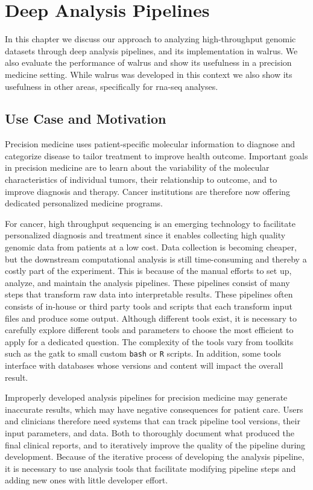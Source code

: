 \chapter{Deep Analysis Pipelines}\label{pipeline}  
In this chapter we discuss our approach to analyzing high-throughput genomic
datasets through deep analysis pipelines, and its implementation in 
walrus.\cite{walrus} We also evaluate the performance of walrus and show its
usefulness in a precision medicine setting. While walrus was developed in this
context we also show its usefulness in other areas, specifically for
\gls{rna}-seq analyses. 

\section{Use Case and Motivation} 
Precision medicine uses patient-specific molecular information to diagnose and
categorize disease to tailor treatment to improve health
outcome.\cite{national2011toward} Important goals in precision medicine are to
learn about the variability of the molecular characteristics of individual
tumors, their relationship to outcome, and to improve diagnosis and
therapy.\cite{tannock2016limits} Cancer institutions are therefore now
offering dedicated personalized medicine programs. 

For cancer, high throughput sequencing is an emerging technology to facilitate
personalized diagnosis and treatment since it enables collecting high quality
genomic data from patients at a low cost. Data collection is becoming cheaper,
but the downstream computational analysis is still time-consuming and thereby
a costly part of the experiment.  This is because of the manual efforts to set
up, analyze, and maintain the analysis pipelines. These pipelines consist of
many steps that transform raw data into interpretable
results.\cite{diao2015building} These pipelines often consists of in-house or
third party tools and scripts that each transform input files and produce some
output. Although different tools exist, it is necessary to carefully explore
different tools and parameters to choose the most efficient to apply for a
dedicated question.\cite{servant2014bioinformatics} The complexity of the tools
vary from toolkits such as the \gls{gatk} to small custom \texttt{bash} or
\texttt{R} scripts.  In addition, some tools interface with databases whose
versions and content will impact the overall result.\cite{sboner2015primer}

Improperly developed analysis pipelines for precision medicine may generate
inaccurate results, which may have negative consequences for patient
care.\cite{roy2017standards} Users and clinicians therefore need systems that
can track pipeline tool versions, their input parameters, and data. Both to
thoroughly document what produced the final clinical reports, and to iteratively
improve the quality of the pipeline during development. Because of the
iterative process of developing the analysis pipeline, it is necessary to use
analysis tools that facilitate modifying pipeline steps and adding new ones with
little developer effort.

